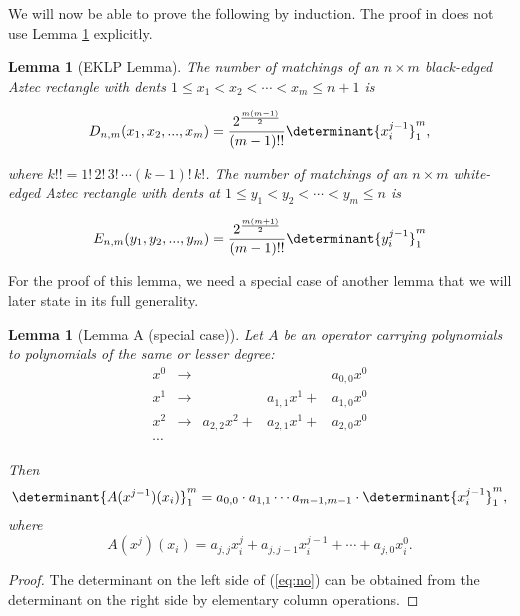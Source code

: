 \documentclass[10pt,reqno]{amsart}
\theoremstyle{plain}
\newtheorem{Lem}[Thm]{Lemma}
\theoremstyle{definition}
\theoremstyle{remark}
\begin{document}
We will now be able to prove the following by induction. The proof
in \cite{EKLP} does not use Lemma \ref{Lem:A} explicitly.

\begin{Lem}[EKLP Lemma]\label{Lem:eklp}
The number of matchings of an $n\times m$ black-edged Aztec rectangle with
dents $1\leq x_1<x_2<\dotsb <x_m\leq n+1$ is

\begin{equation}
D_{n,m}(x_1,x_2,...,x_m) = \frac{2^{\frac{m(m-1)}{2}}}{(m-1)!!} 
			\determinant{x_i^{j-1}}_1^m,
\label{eq:DE} \end{equation}

where $k!! = 1!\, 2!\, 3!\, \dotsb (k-1)!\, k!$. 
The number of matchings of an $n\times m$ white-edged Aztec rectangle with dents
at $1\leq y_1<y_2<\dotsb <y_m\leq n$ is

\begin{equation}
E_{n,m}(y_1,y_2,...,y_m) = \frac{2^{\frac{m(m+1)}{2}}}{(m-1)!!} 
			\determinant{y_i^{j-1}}_1^m
\label{eq:ED} \end{equation}
\end{Lem}

For the proof of this lemma, we need a special case of another lemma that
we will later state in its full generality.

\begin{Lem}[Lemma A (special case)]\label{Lem:A}
Let $A$ be an operator carrying polynomials to
polynomials of the same or lesser degree:
\begin{equation}
\begin{matrix}
x^0 & \to & & & a_{0,0} x^0\\
x^1 & \to & & a_{1,1} x^1 + & a_{1,0} x^0\\
x^2 & \to & a_{2,2} x^2 + & a_{2,1} x^1 + & a_{2,0} x^0\\
\dotsb
\end{matrix}
\end{equation}

Then \begin{equation}
\determinant{A(x^{j-1})(x_i)}_1^m = 
 a_{0,0}\cdot a_{1,1} \dotsb a_{m-1,m-1} \cdot \determinant{x_i^{j-1}}_1^m,
\label{eq:no}
\end{equation}
where 
\begin{equation} 
A(x^j)(x_i) = 
      a_{j,j} x_i^j + a_{j,j-1} x_i^{j-1} + \dotsb + a_{j,0} x_i^0.
\end{equation}
\end{Lem}
\begin{proof}
The determinant on the left side of (\ref{eq:no}) can be obtained from
the determinant on the right side by elementary column operations.
\end{proof}
\end{document}
